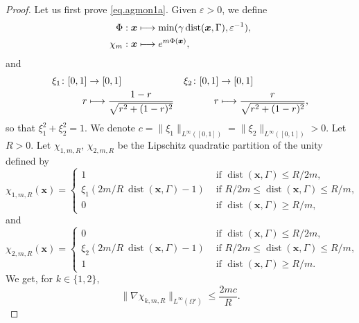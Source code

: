 \documentclass[JEP,XML,SOM,Unicode]{cedram}
\newcommand\mto{\mathchoice{\longmapsto}{\mapsto}{\mapsto}{\mapsto}}
\DeclareMathOperator{\dist}{dist}
\theoremstyle{plain}
\theoremstyle{definition}
\newcommand{\bx}{{\boldsymbol x}}
\let\eps\varepsilon
\begin{document}
\begin{proof}
Let us first prove \eqref{eq.agmon1a}. Given $\eps>0$, we define
\begin{align*}
\Phi : \bx &\mto \min(\gamma \dist(\bx, \Gamma),\eps^{-1}),
\\
\chi_m : \bx&\mto e^{m\Phi(\bx)},
\end{align*}
and
\begin{align*}
\xi_1\colon [0,1]&\to [0,1]&\xi_2\colon [0,1]&\to [0,1]\\
r&\mto\frac{1-r}{\sqrt{r^2+(1-r)^2}}
&r&\mto\frac{r}{\sqrt{r^2+(1-r)^2}},
\end{align*}
so that $\xi_1^2 + \xi_2^2 = 1$.
We denote $c = \|\xi_1\|_{L^\infty([0,1])} = \|\xi_2\|_{L^\infty([0,1])}>0$.
Let $R>0$.
Let $\chi_{1,m,R},\, \chi_{2,m,R}$ be the Lipschitz quadratic partition of the unity defined by
\[
\chi_{1,m,R}(\bx) = \begin{cases}
1 &\mbox{ if } \dist(\bx,\Gamma)\leq R/2m,\\
\xi_1(2m/R\ \dist(\bx,\Gamma)-1)&\mbox{ if } R/2m\leq\dist(\bx, \Gamma)\leq R/m,\\
0 &\mbox{ if } \dist(\bx, \Gamma)\geq R/m,
\end{cases}
\]
and
\[
\chi_{2,m,R}(\bx) = \begin{cases}
0 &\mbox{ if } \dist(\bx,\Gamma)\leq R/2m,\\
\xi_2(2m/R\ \dist(\bx,\Gamma)-1)&\mbox{ if } R/2m\leq\dist(\bx, \Gamma)\leq R/m,\\
1 &\mbox{ if } \dist(\bx, \Gamma)\geq R/m.
\end{cases}
\]
We get, for $k\in \{1,2\}$,
\[
\|\nabla \chi_{k,m,R}\|_{L^\infty(\Omega')}\leq \frac{2m c}{R}.
\]


\end{proof}
\end{document}
